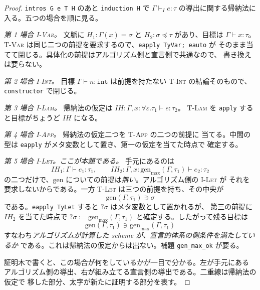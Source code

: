 \documentclass[11pt,a4paper]{ltjsarticle}
\newcommand{\tint}{\mathtt{int}}
\newcommand{\gen}{\mathrm{gen}}
\newcommand{\genmax}{\mathrm{gen}_{\max}}
\newcommand{\inst}{\preceq}
\begin{document}
\begin{proof}
\texttt{intros G e T H} のあと \texttt{induction H} で
$\Gamma \vdash_{\!I} e : \tau$ の導出に関する帰納法に入る。五つの場合を順に見る。

\medskip
\emph{第 1 場合 \textsc{I-Var}。} 文脈に $H_1 : \Gamma(x) = \sigma$ と
$H_2 : \sigma \inst \tau$ があり、目標は $\Gamma \vdash x : \tau$。
\textsc{T-Var} は同じ二つの前提を要求するので、\texttt{eapply TyVar; eauto} が
そのまま当てて閉じる。具体化の前提はアルゴリズム側と宣言側で共通なので、
書き換えは要らない。

\medskip
\emph{第 2 場合 \textsc{I-Int}。} 目標 $\Gamma \vdash n : \tint$ は前提を持たない
\textsc{T-Int} の結論そのもので、\texttt{constructor} で閉じる。

\medskip
\emph{第 3 場合 \textsc{I-Lam}。} 帰納法の仮定は
$\mathit{IH} : \Gamma, x{:}\forall\varepsilon.\tau_1 \vdash e : \tau_2$。
\textsc{T-Lam} を \texttt{apply} すると目標がちょうど $\mathit{IH}$ になる。

\medskip
\emph{第 4 場合 \textsc{I-App}。} 帰納法の仮定二つを \textsc{T-App} の二つの前提に
当てる。中間の型は \texttt{eapply} がメタ変数として置き、第一の仮定を当てた時点で
確定する。

\medskip
\emph{第 5 場合 \textsc{I-Let}。ここが本題である。} 手元にあるのは
\[
  \mathit{IH}_1 : \Gamma \vdash e_1 : \tau_1,
  \qquad
  \mathit{IH}_2 : \Gamma, x{:}\genmax(\Gamma,\tau_1) \vdash e_2 : \tau_2
\]
の二つだけで、$\gen$ についての前提は\emph{無い}。アルゴリズム側の \textsc{I-Let} が
それを要求しないからである。一方 \textsc{T-Let} は三つの前提を持ち、その中央が
\[
  \gen(\Gamma,\tau_1) \ni \sigma
\]
である。\texttt{eapply TyLet} すると $?\sigma$ はメタ変数として置かれるが、
第三の前提に $\mathit{IH}_2$ を当てた時点で
$?\sigma := \genmax(\Gamma,\tau_1)$ と確定する。したがって残る目標は
\[
  \gen(\Gamma,\tau_1) \ni \genmax(\Gamma,\tau_1)
\]
すなわち\emph{アルゴリズムが計算した scheme が、宣言的体系の側条件を満たしているか}
である。これは帰納法の仮定からは出ない。補題 \texttt{gen\_max\_ok} が要る。

\medskip
証明木で書くと、この場合が何をしているかが一目で分かる。左が手元にある
アルゴリズム側の導出、右が組み立てる宣言側の導出である。二重線は帰納法の仮定で
移した部分、太字が新たに証明する部分を表す。



\end{proof}
\end{document}
